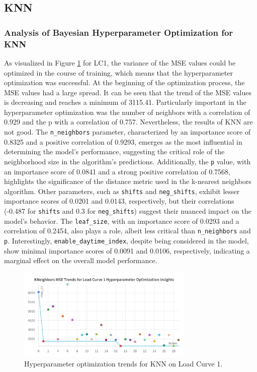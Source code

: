 \documentclass{article} %
\begin{document}
\subsection{KNN}
\subsubsection{Analysis of Bayesian Hyperparameter Optimization for KNN}

As visualized in Figure \ref{fig:knn_lc1} for LC1, the variance of the MSE values could be optimized in the course of training, which means that the hyperparameter optimization was successful. At the beginning of the optimization process, the MSE values had a large spread. It can be seen that the trend of the MSE values is decreasing and reaches a minimum of 3115.41.
Particularly important in the hyperparameter optimization was the number of neighbors with a correlation of 0.929 and the p with a correlation of 0.757. Nevertheless, the results of KNN are not good.   
The \texttt{n\_neighbors} parameter, characterized by an importance score of 0.8325 and a positive correlation of 0.9293, emerges as the most influential in determining the model's performance, suggesting the critical role of the neighborhood size in the algorithm's predictions. Additionally, the \texttt{p} value, with an importance score of 0.0841 and a strong positive correlation of 0.7568, highlights the significance of the distance metric used in the k-nearest neighbors algorithm. Other parameters, such as \texttt{shifts} and \texttt{neg\_shifts}, exhibit lesser importance scores of 0.0201 and 0.0143, respectively, but their correlations (-0.487 for \texttt{shifts} and 0.3 for \texttt{neg\_shifts}) suggest their nuanced impact on the model's behavior. The \texttt{leaf\_size}, with an importance score of 0.0293 and a correlation of 0.2454, also plays a role, albeit less critical than \texttt{n\_neighbors} and \texttt{p}. Interestingly, \texttt{enable\_daytime\_index}, despite being considered in the model, show minimal importance scores of 0.0091 and 0.0106, respectively, indicating a marginal effect on the overall model performance.


\begin{figure}[H]
    \centering
    \includegraphics[width=0.75\textwidth]{ressources/Hyperparams/KNN/KNeighbors MSE Trends for Load Curve 1 Hyperparameter Optimization Insights.png}
    \caption{Hyperparameter optimization trends for KNN on Load Curve 1.}
    \label{fig:knn_lc1}
\end{figure}
\end{document}
